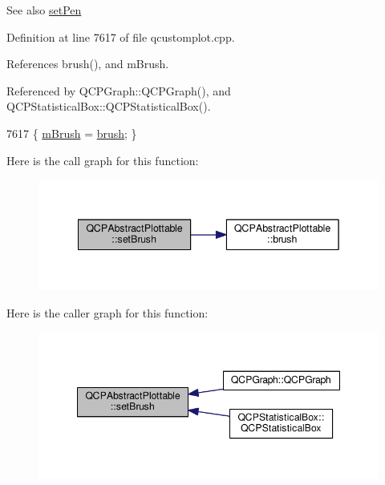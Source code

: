 \begin{DoxySeeAlso}{See also}
\hyperlink{class_q_c_p_abstract_plottable_ab74b09ae4c0e7e13142fe4b5bf46cac7}{set\+Pen} 
\end{DoxySeeAlso}


Definition at line 7617 of file qcustomplot.\+cpp.



References brush(), and m\+Brush.



Referenced by Q\+C\+P\+Graph\+::\+Q\+C\+P\+Graph(), and Q\+C\+P\+Statistical\+Box\+::\+Q\+C\+P\+Statistical\+Box().


\begin{DoxyCode}
7617 \{ \hyperlink{class_q_c_p_abstract_plottable_a33f00674c0161c13315ab9da0895418e}{mBrush} = \hyperlink{class_q_c_p_abstract_plottable_aa74cdceb9c7286ef116fbfa58e0326e7}{brush}; \}
\end{DoxyCode}


Here is the call graph for this function\+:\nopagebreak
\begin{figure}[H]
\begin{center}
\leavevmode
\includegraphics[width=342pt]{class_q_c_p_abstract_plottable_a7a4b92144dca6453a1f0f210e27edc74_cgraph}
\end{center}
\end{figure}




Here is the caller graph for this function\+:\nopagebreak
\begin{figure}[H]
\begin{center}
\leavevmode
\includegraphics[width=348pt]{class_q_c_p_abstract_plottable_a7a4b92144dca6453a1f0f210e27edc74_icgraph}
\end{center}
\end{figure}


